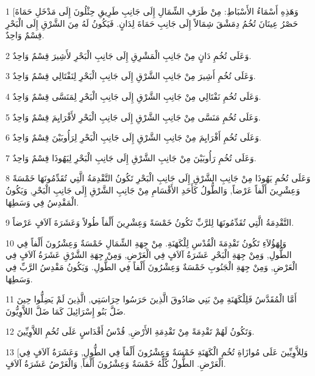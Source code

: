 \par 1 [وَهَذِهِ أَسْمَاءُ الأَسْبَاطِ: مِنْ طَرَفِ الشِّمَالِ إِلَى جَانِبِ طَرِيقِ حِثْلُونَ إِلَى مَدْخَلِ حَمَاةَ حَصْرُ عِينَانَ تُخُمُ دِمَشْقَ شِمَالاً إِلَى جَانِبِ حَمَاةَ لِدَانٍ. فَيَكُونُ لَهُ مِنَ الشَّرْقِ إِلَى الْبَحْرِ قِسْمٌ وَاحِدٌ.
\par 2 وَعَلَى تُخُمِ دَانٍ مِنْ جَانِبِ الْمَشْرِقِ إِلَى جَانِبِ الْبَحْرِ لأَشِيرَ قِسْمٌ وَاحِدٌ.
\par 3 وَعَلَى تُخُمِ أَشِيرَ مِنْ جَانِبِ الشَّرْقِ إِلَى جَانِبِ الْبَحْرِ لِنَفْتَالِي قِسْمٌ وَاحِدٌ.
\par 4 وَعَلَى تُخُمِ نَفْتَالِي مِنْ جَانِبِ الشَّرْقِ إِلَى جَانِبِ الْبَحْرِ لِمَنَسَّى قِسْمٌ وَاحِدٌ.
\par 5 وَعَلَى تُخُمِ مَنَسَّى مِنْ جَانِبِ الشَّرْقِ إِلَى جَانِبِ الْبَحْرِ لأَفْرَايِمَ قِسْمٌ وَاحِدٌ.
\par 6 وَعَلَى تُخُمِ أَفْرَايِمَ مِنْ جَانِبِ الشَّرْقِ إِلَى جَانِبِ الْبَحْرِ لِرَأُوبَيْنَ قِسْمٌ وَاحِدٌ.
\par 7 وَعَلَى تُخُمِ رَأُوبَيْنَ مِنْ جَانِبِ الشَّرْقِ إِلَى جَانِبِ الْبَحْرِ لِيَهُوذَا قِسْمٌ وَاحِدٌ.
\par 8 وَعَلَى تُخُمِ يَهُوذَا مِنْ جَانِبِ الشَّرْقِ إِلَى جَانِبِ الْبَحْرِ تَكُونُ التَّقْدِمَةُ الَّتِي تُقَدِّمُونَهَا خَمْسَةً وَعِشْرِينَ أَلْفاً عَرْضاً, وَالطُّولُ كَأَحَدِ الأَقْسَامِ مِنْ جَانِبِ الشَّرْقِ إِلَى جَانِبِ الْبَحْرِ, وَيَكُونُ الْمَقْدِسُ فِي وَسَطِهَا.
\par 9 التَّقْدِمَةُ الَّتِي تُقَدِّمُونَهَا لِلرَّبِّ تَكُونُ خَمْسَةً وَعِشْرِينَ أَلْفاً طُولاً وَعَشَرَةَ آلاَفٍ عَرْضاً.
\par 10 وَلِهَؤُلاَءِ تَكُونُ تَقْدِمَةَ الْقُدْسِ لِلْكَهَنَةِ. مِنْ جِهَةِ الشِّمَالِ خَمْسَةٌ وَعِشْرُونَ أَلْفاً فِي الطُّولِ, وَمِنْ جِهَةِ الْبَحْرِ عَشَرَةُ آلاَفٍ فِي الْعَرْضِ, وَمِنْ جِهَةِ الشَّرْقِ عَشَرَةُ آلاَفٍ فِي الْعَرْضِ, وَمِنْ جِهَةِ الْجَنُوبِ خَمْسَةٌ وَعِشْرُونَ أَلْفاً فِي الطُّولِ. وَيَكُونُ مَقْدِسُ الرَّبِّ فِي وَسَطِهَا.
\par 11 أَمَّا الْمُقَدَّسُ فَلِلْكَهَنَةِ مِنْ بَنِي صَادُوقَ الَّذِينَ حَرَسُوا حِرَاسَتِي, الَّذِينَ لَمْ يَضِلُّوا حِينَ ضَلَّ بَنُو إِسْرَائِيلَ كَمَا ضَلَّ اللاَّوِيُّونَ.
\par 12 وَتَكُونُ لَهُمْ تَقْدِمَةً مِنْ تَقْدِمَةِ الأَرْضِ, قُدْسُ أَقْدَاسٍ عَلَى تُخُمِ اللاَّوِيِّينَ.
\par 13 [وَلِلاَّوِيِّينَ عَلَى مُوازَاةِ تُخُمِ الْكَهَنَةِ خَمْسَةٌ وَعِشْرُونَ أَلْفاً فِي الطُّولِ, وَعَشَرَةُ آلاَفٍ فِي الْعَرْضِ. الطُّولُ كُلُّهُ خَمْسَةٌ وَعِشْرُونَ أَلْفاً, وَالْعَرْضُ عَشَرَةُ آلاَفٍ.
